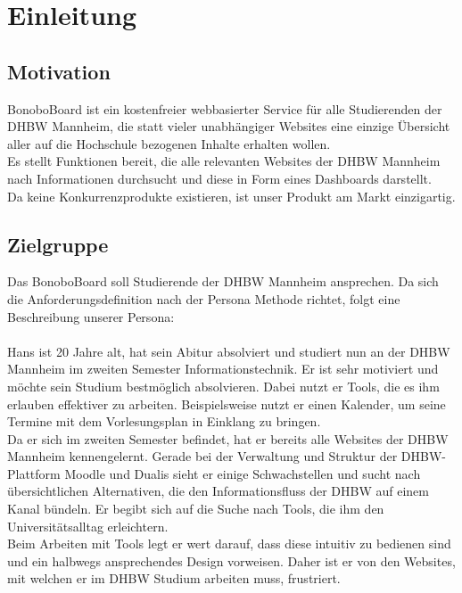 \documentclass[a4paper,11pt]{scrartcl}
\begin{document}


\section{Einleitung}
	\subsection{Motivation} %
BonoboBoard ist ein kostenfreier webbasierter Service für alle Studierenden der DHBW Mannheim, die statt vieler unabhängiger Websites eine einzige Übersicht aller auf die Hochschule bezogenen Inhalte erhalten wollen.\\
Es stellt Funktionen bereit, die alle relevanten Websites der DHBW Mannheim nach Informationen durchsucht und diese in Form eines Dashboards darstellt.\\
Da keine Konkurrenzprodukte existieren, ist unser Produkt am Markt einzigartig.


	\subsection{Zielgruppe} %
Das BonoboBoard soll Studierende der DHBW Mannheim ansprechen. Da sich die Anforderungsdefinition nach der Persona Methode richtet, folgt eine Beschreibung unserer Persona:\\\\
Hans ist 20 Jahre alt, hat sein Abitur absolviert und studiert nun an der DHBW Mannheim im zweiten Semester Informationstechnik. Er ist sehr motiviert und möchte sein Studium bestmöglich absolvieren. Dabei nutzt er Tools, die es ihm erlauben effektiver zu arbeiten. Beispielsweise nutzt er einen Kalender, um seine Termine mit dem Vorlesungsplan in Einklang zu bringen.\\ %
\noindent
Da er sich im zweiten Semester befindet, hat er bereits alle Websites der DHBW Mannheim kennengelernt. Gerade bei der Verwaltung und Struktur der DHBW-Plattform Moodle und Dualis sieht er einige Schwachstellen und sucht nach übersichtlichen Alternativen, die den Informationsfluss der DHBW auf einem Kanal bündeln. Er begibt sich auf die Suche nach Tools, die ihm den Universitätsalltag erleichtern.\\
Beim Arbeiten mit Tools legt er wert darauf, dass diese intuitiv zu bedienen sind und ein halbwegs ansprechendes Design vorweisen. Daher ist er von den Websites, mit welchen er im DHBW Studium arbeiten muss, frustriert.
\end{document}
